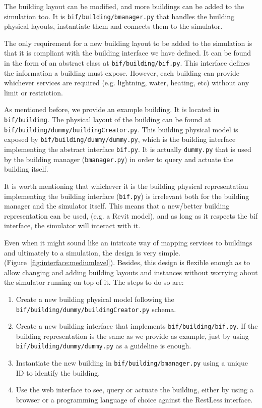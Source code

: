 \documentclass[10pt]{article}
\begin{document}
The building layout can be modified, and more buildings can be added to the simulation too. It is \texttt{bif/building/bmanager.py} that handles the building physical layouts, instantiate them and connects them to the simulator.

The only requirement for a new building layout to be added to the simulation is that it is compliant with the building interface we have defined. It can be found in the form of an abstract class at \texttt{bif/building/bif.py}. This interface defines the information a building must expose. However, each building can provide whichever services are required (e.g.  lightning, water, heating, etc) without any limit or restriction. 

As mentioned before, we provide an example building. It is located in \texttt{bif/building}. The physical layout of the building can be found at \texttt{bif/building/dummy/buildingCreator.py}. This building physical model is exposed by \texttt{bif/building/dummy/dummy.py}, which is the building interface implementing the abstract interface \texttt{bif.py}. It is actually \texttt{dummy.py} that is used by the building manager (\texttt{bmanager.py}) in order to query and actuate the building itself.

It is worth mentioning that whichever it is the building physical representation implementing the building interface (\texttt{bif.py}) is irrelevant both for the building manager and the simulator itself. This means that a new/better building representation can be used, (e.g. a Revit model), and as long as it respects the bif interface, the simulator will interact with it.

Even when it might sound like an intricate way of mapping services to buildings and ultimately to a simulation, the design is very simple. (Figure~\ref{fig:interface:mediumlevel}). Besides, this design is flexible enough as to allow changing and adding building layouts and instances without worrying about the simulator running on top of it. The steps to do so are:

\begin{enumerate}
\item Create a new building physical model following the \texttt{bif/building/dummy/buildingCreator.py} schema.
\item Create a new building interface that implements \texttt{bif/building/bif.py}. If the building representation is the same as we provide as example, just by using \texttt{bif/building/dummy/dummy.py} as a guideline is enough.
\item Instantiate the new building in \texttt{bif/building/bmanager.py} using a unique ID to identify the building.
\item Use the web interface to see, query or actuate the building, either by using a browser or a programming language of choice against the RestLess interface.
\end{enumerate}
\end{document}
